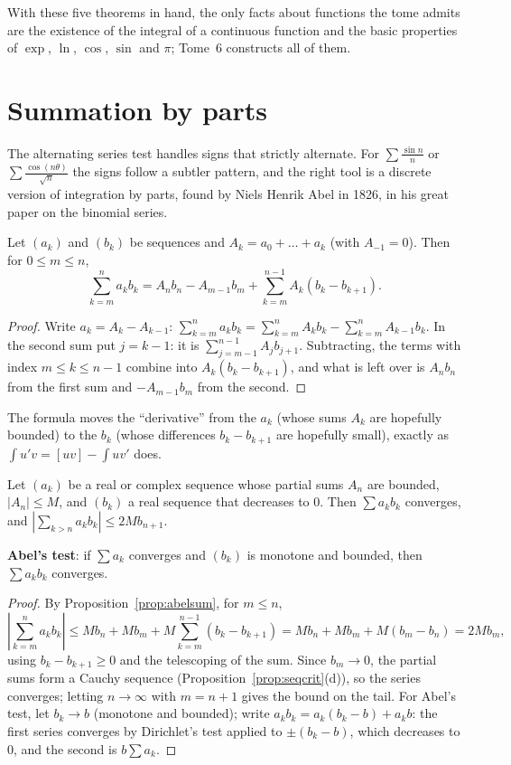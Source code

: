 With these five theorems in hand, the only facts about functions the tome admits are the existence of the integral of a continuous function and
the basic properties of $\exp$, $\ln$, $\cos$, $\sin$ and $\pi$; Tome~6 constructs all of them.

\section{Summation by parts}

The alternating series test handles signs that strictly alternate. For $\sum\frac{\sin n}n$ or $\sum\frac{\cos(n\theta)}{\sqrt n}$ the signs follow a
subtler pattern, and the right tool is a discrete version of integration by parts, found by Niels Henrik Abel in 1826, in his great paper on the binomial series.

\begin{proposition}\label{prop:abelsum}
Let $(a_k)$ and $(b_k)$ be sequences and $A_k=a_0+\dots+a_k$ (with $A_{-1}=0$). Then for $0\le m\le n$,
\[
\sum_{k=m}^na_kb_k=A_nb_n-A_{m-1}b_m+\sum_{k=m}^{n-1}A_k(b_k-b_{k+1}).
\]
\end{proposition}
\begin{proof}
Write $a_k=A_k-A_{k-1}$: $\sum_{k=m}^na_kb_k=\sum_{k=m}^nA_kb_k-\sum_{k=m}^nA_{k-1}b_k$. In the second sum put $j=k-1$: it is $\sum_{j=m-1}^{n-1}A_jb_{j+1}$.
Subtracting, the terms with index $m\le k\le n-1$ combine into $A_k(b_k-b_{k+1})$, and what is left over is $A_nb_n$ from the first sum and $-A_{m-1}b_m$ from the second.
\end{proof}

The formula moves the ``derivative'' from the $a_k$ (whose sums $A_k$ are hopefully bounded) to the $b_k$ (whose differences $b_k-b_{k+1}$ are hopefully small), exactly as
$\int u'v=[uv]-\int uv'$ does.

\begin{theorem}\label{thm:dirichlettest}
Let $(a_k)$ be a real or complex sequence whose partial sums $A_n$ are bounded, $|A_n|\le M$, and $(b_k)$ a real sequence that decreases to $0$. Then
$\sum a_kb_k$ converges, and $\left|\sum_{k>n}a_kb_k\right|\le2Mb_{n+1}$.

\textbf{Abel's test}: if $\sum a_k$ converges and $(b_k)$ is monotone and bounded, then $\sum a_kb_k$ converges.
\end{theorem}
\begin{proof}
By Proposition~\ref{prop:abelsum}, for $m\le n$,
\[
\left|\sum_{k=m}^na_kb_k\right|\le Mb_n+Mb_m+M\sum_{k=m}^{n-1}(b_k-b_{k+1})=Mb_n+Mb_m+M(b_m-b_n)=2Mb_m,
\]
using $b_k-b_{k+1}\ge0$ and the telescoping of the sum. Since $b_m\to0$, the partial sums form a Cauchy sequence (Proposition~\ref{prop:seqcrit}(d)), so the series converges;
letting $n\to\infty$ with $m=n+1$ gives the bound on the tail. For Abel's test, let $b_k\to b$ (monotone and bounded); write $a_kb_k=a_k(b_k-b)+a_kb$: the first series converges
by Dirichlet's test applied to $\pm(b_k-b)$, which decreases to $0$, and the second is $b\sum a_k$.
\end{proof}

